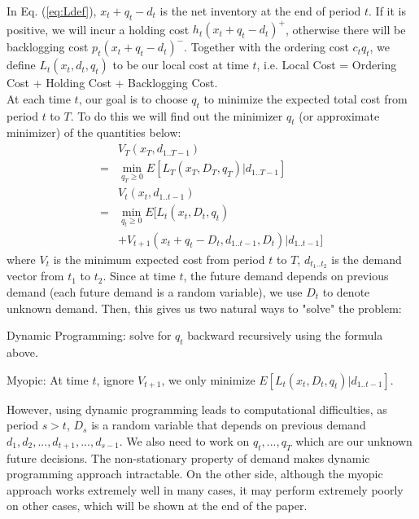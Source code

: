 \documentclass[twoside]{article}
\begin{document}
\begin{multicols}{2}
    In Eq. (\ref{eq:Ldef}), $x_t + q_t - d_t$ is the net inventory at the end of period $t$. If it is positive, we will incur a holding cost $h_t(x_t + q_t - d_t)^{+}$, otherwise there will be backlogging cost $p_t(x_t + q_t - d_t)^{-}$. Together with the ordering cost $c_tq_t$, we define $L_t(x_t,d_t,q_t)$ to be our local cost at time $t$, i.e. Local Cost = Ordering Cost + Holding Cost + Backlogging Cost.\\
    At each time $t$, our goal is to choose $q_t$ to minimize the expected total cost from period $t$ to $T$. To do this we will find out the minimizer $q_t$ (or approximate minimizer) of the quantities below:
    \begin{equation}\label{eq:Vt}
    \begin{array}{rl}
    & V_T(x_T,d_{1..T-1}) \\
    = & \min_{q_T \geq 0} E[L_T(x_T,D_T,q_T) | d_{1..T-1}]\\
    &V_t(x_t,d_{1..t-1}) \\
    = & \min_{q_t \geq 0} E[L_t(x_t,D_t,q_t)\\
    & +V_{t+1}(x_t + q_t - D_t, d_{1..t-1},D_t)|d_{1..t-1}]
    \end{array}
    \end{equation}
    where $V_t$ is the minimum expected cost from period $t$ to $T$, $d_{t_1..t_2}$ is the demand vector from $t_1$ to $t_2$. Since at time $t$, the future demand depends on previous demand (each future demand is a random variable), we use $D_t$ to denote unknown demand. Then, this gives us two natural ways to "solve" the problem:
    \begin{compactitem}
      \item
        Dynamic Programming: solve for $q_t$ backward recursively using the formula above.
      \item
        Myopic: At time $t$, ignore $V_{t+1}$, we only minimize $E[L_t(x_t,D_t,q_t)|d_{1..t-1}]$.
    \end{compactitem}
     However, using dynamic programming leads to computational difficulties, as period $s>t$, $D_s$ is a random variable that depends on previous demand $d_1, d_2,...,d_{t+1},...,d_{s-1}$. We also need to work on $q_t,...,q_T$ which are our unknown future decisions. The non-stationary property of demand makes dynamic programming approach intractable. On the other side, although the myopic approach works extremely well in many cases\cite{CLAcha1}, it may perform extremely poorly on other cases, which will be shown at the end of the paper.\\


\end{multicols}
\end{document}
